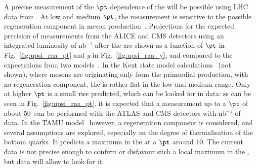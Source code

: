 \documentclass[../report.tex]{subfiles}
\begin{document}
A precise measurement of the $\pt$ dependence of the  \raa will be possible using LHC data from \RunsThreeFour. At low and medium $\pt$, the measurement is
sensitive to the possible regeneration component in \PGU meson production~\cite{Du:2017qkv}. Projections for the expected precision of \PGU measurements from the ALICE and CMS detectors
using an integrated luminosity of \unit[10]{nb}$^{-1}$ after the \RunsThreeFour are shown as a function of $\pt$ in Fig.~\ref{fig:upsi_raa_pt} and $y$ in Fig.~\ref{fig:upsi_raa_y}, and compared to the expectations from two 
models~\cite{Krouppa:2017jlg,Du:2017qkv}. In the Kent state model calculations~\cite{Krouppa:2017jlg} (not shown), where \PgU mesons are originating only from the primordial
production, with no regeneration component, the \raa is rather flat in the low and medium \pt range.
Only at higher $\pt$ is a small rise predicted, which can be looked for in \RunsThreeFour data: ss can be seen in Fig.~\ref{fig:upsi_raa_pt}, it is expected that a measurement up to a $\pt$ of about 50\UGeVc\ can be performed with the ATLAS and CMS detectors with
\unit[10]{nb}$^{-1}$ of data. 
In the TAMU model~\cite{Du:2017qkv} however, a regeneration
component is considered, and several assumptions are explored, especially on the degree of thermalisation of the bottom quarks. 
It predicts a maximum in the  \raa at a $\pt$ around 10\UGeVc. The current data is not precise enough to confirm or disfavour such a local maximum in the \raa, but \RunsThreeFour 
data will allow to look for it.
\end{document}
